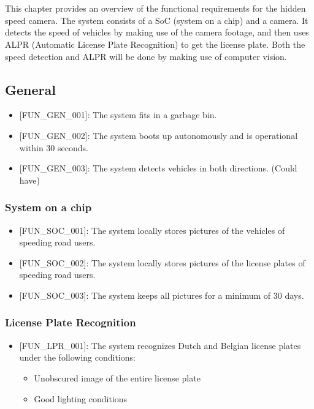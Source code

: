 \chapter{}
\label{chap:functional-overview}

This chapter provides an overview of the functional requirements for the hidden speed camera.
The system consists of a SoC (system on a chip) and a camera.
It detects the speed of vehicles by making use of the camera footage, and then uses ALPR (Automatic License Plate Recognition) to get the license plate.
Both the speed detection and ALPR will be done by making use of computer vision.

\section{General}

\begin{itemize}
    \item {[FUN\_GEN\_001]}: The system fits in a garbage bin.
    \item {[FUN\_GEN\_002]}: The system boots up autonomously and is operational within 30 seconds.
    \item {[FUN\_GEN\_003]}: The system detects vehicles in both directions. (Could have)
\end{itemize}

\subsection{System on a chip}

\begin{itemize}
    \item {[FUN\_SOC\_001]}: The system locally stores pictures of the vehicles of speeding road users.
    \item {[FUN\_SOC\_002]}: The system locally stores pictures of the license plates of speeding road users.
    \item {[FUN\_SOC\_003]}: The system keeps all pictures for a minimum of 30 days.
\end{itemize}

\subsection{License Plate Recognition}

\begin{itemize}
    \item {[FUN\_LPR\_001]}: The system recognizes Dutch and Belgian license plates under the following conditions:
    \begin{itemize}
        \label{iss:lighting}
        \item Unobscured image of the entire license plate
        \item Good lighting conditions
    \end{itemize}
\end{itemize}

